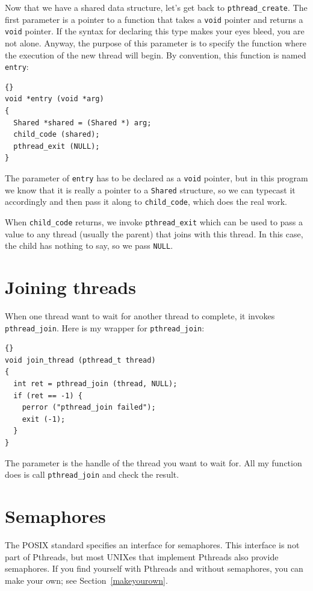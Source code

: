 \documentclass{book}
\begin{document}
Now that we have a shared data structure, let's get back to
{\tt pthread\_create}.
The first parameter is a pointer to a function that takes
a {\tt void} pointer and returns a {\tt void} pointer.  If the syntax
for declaring this type makes your eyes bleed, you are not alone.
Anyway, the purpose of this parameter is to specify the function where
the execution of the new thread will begin.  By convention, this
function is named {\tt entry}:

\begin{lstlisting}[title={}]{}
void *entry (void *arg)
{
  Shared *shared = (Shared *) arg;
  child_code (shared);
  pthread_exit (NULL);
}
\end{lstlisting}

The parameter of {\tt entry} has to be declared as a {\tt void}
pointer, but in this program we know that it is really a pointer to a
{\tt Shared} structure, so we can typecast it accordingly and then
pass it along to {\tt child\_code}, which does the real work.

When {\tt child\_code} returns, we invoke {\tt pthread\_exit}
which can be used to pass a value to any thread (usually the
parent) that joins with this thread.  In this case, the child
has nothing to say, so we pass {\tt NULL}.


\section{Joining threads}

When one thread want to wait for another thread to complete,
it invokes {\tt pthread\_join}.
Here is my wrapper for {\tt pthread\_join}:

\begin{lstlisting}[title={}]{}
void join_thread (pthread_t thread)
{
  int ret = pthread_join (thread, NULL);
  if (ret == -1) {
    perror ("pthread_join failed");
    exit (-1);
  }
}
\end{lstlisting}

The parameter is the handle of the thread you want to wait for.
All my function does is call {\tt pthread\_join} and check the
result.


\section{Semaphores}

The POSIX standard specifies an interface for semaphores.
This interface is not part of Pthreads, but most UNIXes
that implement Pthreads also provide semaphores.  If you
find yourself with Pthreads and without semaphores, you
can make your own; see Section~\ref{makeyourown}.
\end{document}
